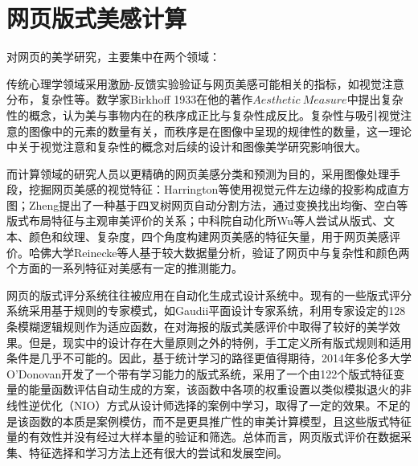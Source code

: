 \section{网页版式美感计算}

对网页的美学研究，主要集中在两个领域：

传统心理学领域采用激励-反馈实验验证与网页美感可能相关的指标，如视觉注意分布\cite{Djamasbi2011}，复杂性\cite{Michailidou2008, Tuch2012Is}等。数学家Birkhoff 1933在他的著作$Aesthetic ~Measure$中提出复杂性的概念，认为美与事物内在的秩序成正比与复杂性成反比。复杂性与吸引视觉注意的图像中的元素的数量有关，而秩序是在图像中呈现的规律性的数量，这一理论中关于视觉注意和复杂性的概念对后续的设计和图像美学研究影响很大。

而计算领域的研究人员以更精确的网页美感分类和预测为目的，采用图像处理手段，挖掘网页美感的视觉特征：Harrington等使用视觉元件左边缘的投影构成直方图\cite{Harrington2004}；Zheng提出了一种基于四叉树网页自动分割方法\cite{Zheng}，通过变换找出均衡、空白等版式布局特征与主观审美评价的关系；中科院自动化所Wu等人尝试从版式、文本、颜色和纹理、复杂度，四个角度构建网页美感的特征矢量\cite{Wu2011}，用于网页美感评价。哈佛大学Reinecke等人基于较大数据量分析，验证了网页中与复杂性和颜色两个方面的一系列特征对美感有一定的推测能力\cite{Reinecke}。

网页的版式评分系统往往被应用在自动化生成式设计系统中。现有的一些版式评分系统采用基于规则的专家模式，如Gaudii平面设计专家系统\cite{Gonzalez2010}，利用专家设定的128条模糊逻辑规则作为适应函数，在对海报的版式美感评价中取得了较好的美学效果。但是，现实中的设计存在大量原则之外的特例，手工定义所有版式规则和适用条件是几乎不可能的。因此，基于统计学习的路径更值得期待，2014年多伦多大学O’Donovan开发了一个带有学习能力的版式系统\cite{O2014}，采用了一个由122个版式特征变量的能量函数评估自动生成的方案，该函数中各项的权重设置以类似模拟退火的非线性逆优化（NIO）方式从设计师选择的案例中学习，取得了一定的效果。不足的是该函数的本质是案例模仿，而不是更具推广性的审美计算模型，且这些版式特征量的有效性并没有经过大样本量的验证和筛选。总体而言，网页版式评价在数据采集、特征选择和学习方法上还有很大的尝试和发展空间。

